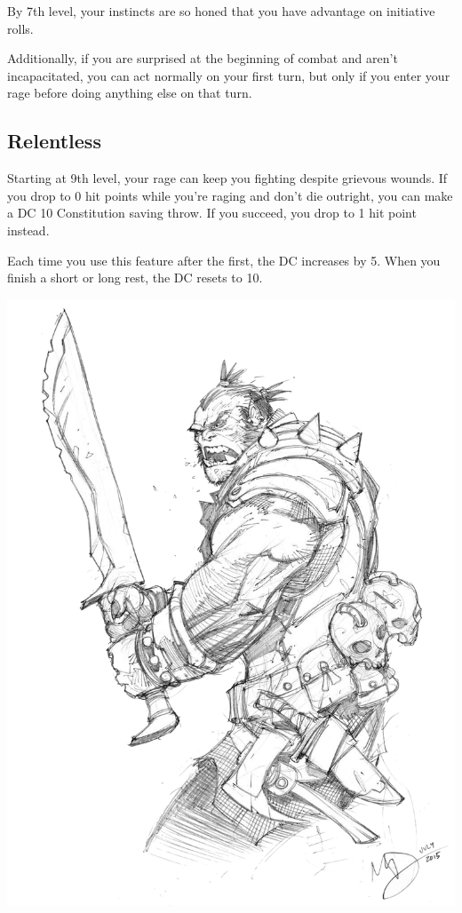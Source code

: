 \begin{multicols*}{2}
By 7th level, your instincts are so honed that you have advantage on initiative rolls.

Additionally, if you are surprised at the beginning of combat and aren’t incapacitated, you can act normally on your first turn, but only if you enter your rage before doing anything else on that turn.

\subsection*{Relentless}

Starting at 9th level, your rage can keep you fighting despite grievous wounds. If you drop to 0 hit points while you’re raging and don’t die outright, you can make a DC 10 Constitution saving throw. If you succeed, you drop to 1 hit point instead.

Each time you use this feature after the first, the DC increases by 5. When you finish a short or long rest, the DC resets to 10.


\begin{Figure}
\centering
\includegraphics[width=\textwidth]{img/barbarian-half-orc.png}
\end{Figure}
    
\end{multicols*}